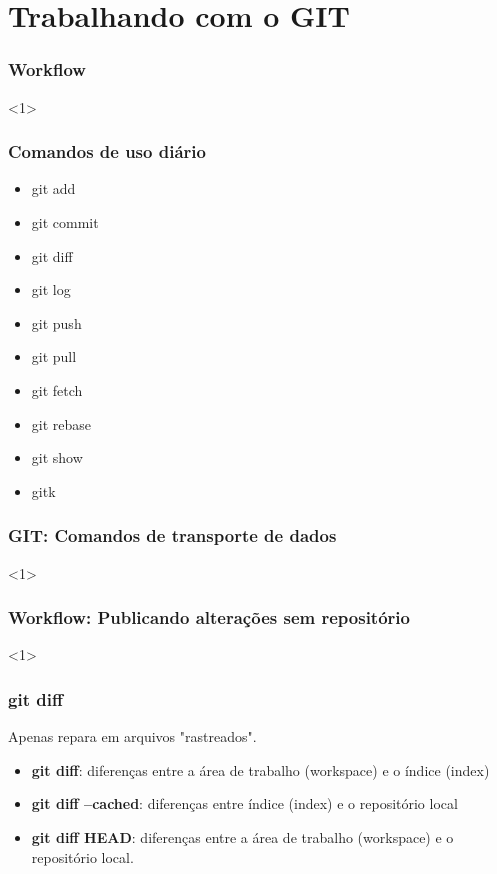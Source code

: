 \section{Trabalhando com o GIT}
\begin{frame}
\frametitle{Workflow}

<1>

\end{frame}


\begin{frame}
\frametitle{Comandos de uso diário}


\begin{itemize}
\item git add
\item git commit
\item git diff
\item git log
\item git push
\item git pull
\item git fetch
\item git rebase
\item git show
\item gitk
\end{itemize}


\end{frame}

\begin{frame}
\frametitle{GIT: Comandos de transporte de dados}

<1>

\end{frame}

\begin{frame}
\frametitle{Workflow: Publicando alterações sem repositório}

<1>

\end{frame}

\begin{frame}
\frametitle{git diff}


Apenas repara em arquivos "rastreados".

\begin{itemize}
\item \textbf{git diff}: diferenças entre a área de trabalho (workspace) e o índice (index)
\item \textbf{git diff --cached}: diferenças entre índice (index) e o repositório local
\item \textbf{git diff HEAD}: diferenças entre a área de trabalho (workspace) e o repositório local.
\end{itemize}
\end{frame}

